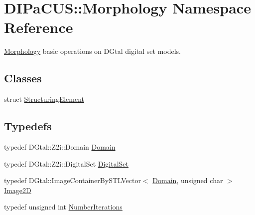 \hypertarget{namespaceDIPaCUS_1_1Morphology}{}\section{D\+I\+Pa\+C\+US\+:\+:Morphology Namespace Reference}
\label{namespaceDIPaCUS_1_1Morphology}


\mbox{\hyperlink{namespaceDIPaCUS_1_1Morphology}{Morphology}} basic operations on D\+Gtal digital set models.  


\subsection*{Classes}
\begin{DoxyCompactItemize}
\item 
struct \mbox{\hyperlink{structDIPaCUS_1_1Morphology_1_1StructuringElement}{Structuring\+Element}}
\end{DoxyCompactItemize}
\subsection*{Typedefs}
\begin{DoxyCompactItemize}
\item 
typedef D\+Gtal\+::\+Z2i\+::\+Domain \mbox{\hyperlink{namespaceDIPaCUS_1_1Morphology_ab9f5fc1118b80b969855f77bee7d9914}{Domain}}
\item 
typedef D\+Gtal\+::\+Z2i\+::\+Digital\+Set \mbox{\hyperlink{namespaceDIPaCUS_1_1Morphology_ab69fa725716b0ed4c311c0d00a292be7}{Digital\+Set}}
\item 
typedef D\+Gtal\+::\+Image\+Container\+By\+S\+T\+L\+Vector$<$ \mbox{\hyperlink{namespaceDIPaCUS_1_1Morphology_ab9f5fc1118b80b969855f77bee7d9914}{Domain}}, unsigned char $>$ \mbox{\hyperlink{namespaceDIPaCUS_1_1Morphology_a9aff9edf28d681accfc54435fbefcbee}{Image2D}}
\item 
typedef unsigned int \mbox{\hyperlink{namespaceDIPaCUS_1_1Morphology_a8ffa7d1c2023be8b21bc87a4b7df7cca}{Number\+Iterations}}
\end{DoxyCompactItemize}
